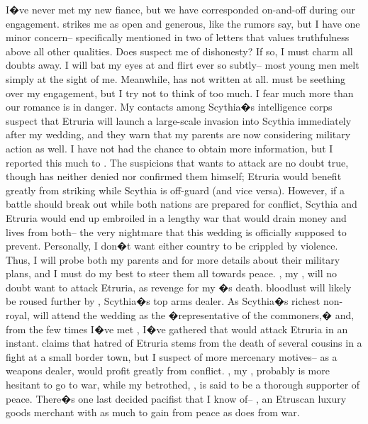 \documentclass[char]{Kos}
\begin{document}
	I�ve never met my new fiance, but we have corresponded on-and-off during our engagement. \cGroom{\They} strikes me as open and generous, like the rumors say, but I have one minor concern-- \cGroom{\they} specifically mentioned in two of \cGroom{\their} letters that \cGroom{\they} values truthfulness above all other qualities. Does \cGroom{\they} suspect me of dishonesty? If so, I must charm all \cGroom{\their} doubts away. I will bat my eyes at \cGroom{\them} and flirt ever so subtly-- most young men melt simply at the sight of me.
	Meanwhile, \cPoet{\nickname} has not written at all. 
\cPoet{\They} must be seething over my engagement, but I try not to think of \cPoet{\them} too much. I fear much more than our romance is in danger. My contacts among Scythia�s intelligence corps suspect that Etruria will launch a large-scale invasion into Scythia immediately after my wedding, and they warn that my parents are now considering military action as well. I have not had the chance to obtain more information, but I reported this much to \cEtruriaKing{\nickname}. The suspicions that \cEtruriaKing{\they} wants to attack are no doubt true, though \cEtruriaKing{\they} has neither denied nor confirmed them himself; Etruria would benefit greatly from striking while Scythia is off-guard (and vice versa). However, if a battle should break out while both nations are prepared for conflict, Scythia and Etruria would end up embroiled in a lengthy war that would drain money and lives from both-- the very nightmare that this wedding is officially supposed to prevent. Personally, I don�t want either country to be crippled by violence. Thus, I will probe both my parents and \cEtruriaKing{\nickname} for more details about their military plans, and I must do my best to steer them all towards peace.
\cScythiaQueen{\nickname}, my \cScythiaQueen{\parent}, will no doubt want to attack Etruria, as revenge for my \cFugitive{\sibling}�s death. \cScythiaQueen{\Their} bloodlust will likely be roused further by \cArmsDealer{\name}, Scythia�s top arms dealer. As Scythia�s richest non-royal, \cArmsDealer{\nickname} will attend the wedding as the �representative of the commoners,� and, from the few times I�ve met \cArmsDealer{\them}, I�ve gathered that \cArmsDealer{\they} would attack Etruria in an instant. \cArmsDealer{\They} claims that \cArmsDealer{\their} hatred of Etruria stems from the death of several cousins in a fight at a small border town, but I suspect \cArmsDealer{\them} of more mercenary motives-- as a weapons dealer, \cArmsDealer{\nickname} would profit greatly from conflict. \cScythiaKing{\nickname}, my \cScythiaKing{\parent}, probably is more hesitant to go to war, while my betrothed, \cGroom{\them}, is said to be a thorough supporter of peace. There�s one last decided pacifist that I know of-- \cMerchant{\name}, an Etruscan luxury goods merchant with as much to gain from peace as \cArmsDealer{\nickname} does from war.
\end{document}
